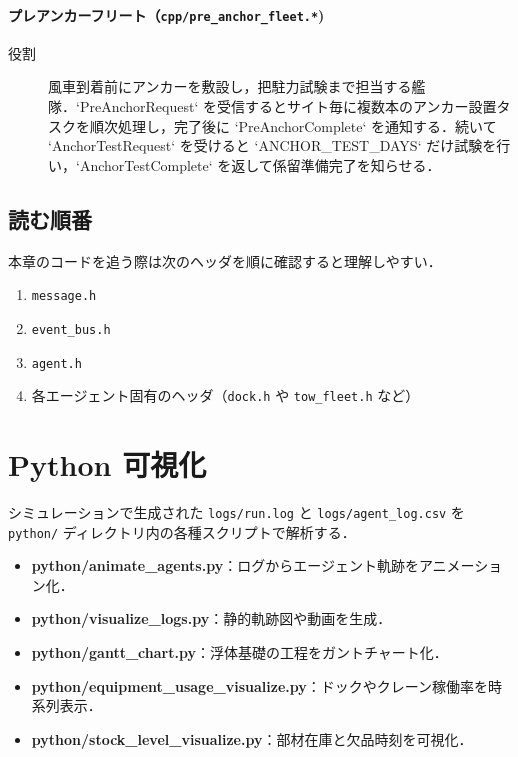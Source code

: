 \documentclass[10pt,letterpaper]{jsarticle}
\begin{document}
\paragraph{プレアンカーフリート（\texttt{cpp/pre\_anchor\_fleet.*})}
\begin{description}
  \item[役割] 風車到着前にアンカーを敷設し，把駐力試験まで担当する艦隊．`PreAnchorRequest` を受信するとサイト毎に複数本のアンカー設置タスクを順次処理し，完了後に `PreAnchorComplete` を通知する．続いて `AnchorTestRequest` を受けると `ANCHOR\_TEST\_DAYS` だけ試験を行い，`AnchorTestComplete` を返して係留準備完了を知らせる．
\end{description}

\subsection*{読む順番}
本章のコードを追う際は次のヘッダを順に確認すると理解しやすい．
\begin{enumerate}
  \item \texttt{message.h}
  \item \texttt{event\_bus.h}
  \item \texttt{agent.h}
  \item 各エージェント固有のヘッダ（\texttt{dock.h} や \texttt{tow\_fleet.h} など）
\end{enumerate}

\section{Python 可視化}
シミュレーションで生成された \texttt{logs/run.log} と
\texttt{logs/agent\_log.csv} を \texttt{python/} ディレクトリ内の各種スクリプトで解析する．

\begin{itemize}
  \item \textbf{python/animate\_agents.py}：ログからエージェント軌跡をアニメーション化．
  \item \textbf{python/visualize\_logs.py}：静的軌跡図や動画を生成．
  \item \textbf{python/gantt\_chart.py}：浮体基礎の工程をガントチャート化．
  \item \textbf{python/equipment\_usage\_visualize.py}：ドックやクレーン稼働率を時系列表示．
  \item \textbf{python/stock\_level\_visualize.py}：部材在庫と欠品時刻を可視化．
\end{itemize}
\end{document}
